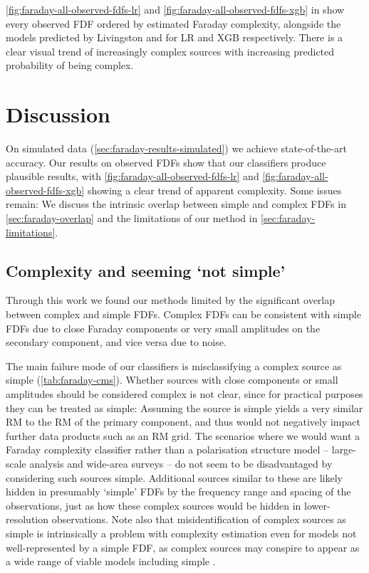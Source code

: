     \autoref{fig:faraday-all-observed-fdfs-lr} and \autoref{fig:faraday-all-observed-fdfs-xgb} in  show every observed FDF ordered by estimated Faraday complexity, alongside the models predicted by Livingston and \citet{osullivan_broad-band_2017} for LR and XGB respectively. There is a clear visual trend of increasingly complex sources with increasing predicted probability of being complex.

\section{Discussion}
\label{sec:faraday-discussion}

  On simulated data (\autoref{sec:faraday-results-simulated}) we achieve state-of-the-art accuracy. Our results on observed FDFs show that our classifiers produce plausible results, with \autoref{fig:faraday-all-observed-fdfs-lr} and \autoref{fig:faraday-all-observed-fdfs-xgb} showing a clear trend of apparent complexity. Some issues remain: We discuss the intrinsic overlap between simple and complex FDFs in \autoref{sec:faraday-overlap} and the limitations of our method in \autoref{sec:faraday-limitations}.

  \subsection{Complexity and seeming `not simple'}
  \label{sec:faraday-overlap}

    Through this work we found our methods limited by the significant overlap between complex and simple FDFs. Complex FDFs can be consistent with simple FDFs due to close Faraday components or very small amplitudes on the secondary component, and vice versa due to noise.

    The main failure mode of our classifiers is misclassifying a complex source as simple (\autoref{tab:faraday-cms}). Whether sources with close components or small amplitudes should be considered complex is not clear, since for practical purposes they can be treated as simple: Assuming the source is simple yields a very similar RM to the RM of the primary component, and thus would not negatively impact further data products such as an RM grid. The scenarios where we would want a Faraday complexity classifier rather than a polarisation structure model -- large-scale analysis and wide-area surveys -- do not seem to be disadvantaged by considering such sources simple. Additional sources similar to these are likely hidden in presumably `simple' FDFs by the frequency range and spacing of the observations, just as how these complex sources would be hidden in lower-resolution observations. Note also that misidentification of complex sources as simple is intrinsically a problem with complexity estimation even for models not well-represented by a simple FDF, as complex sources may conspire to appear as a wide range of viable models including simple \citep{sun15comparison}.

